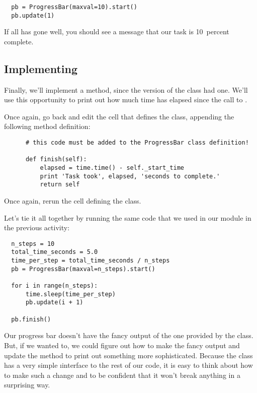 \documentclass[letterpaper, 12pt, titlepage, twoside]{article}
\begin{document}
\begin{lstlisting}
  pb = ProgressBar(maxval=10).start()
  pb.update(1)
\end{lstlisting}

If all has gone well, you should see a message that our task is 10~percent
complete.

\subsection*{Implementing }

Finally, we'll implement a  method, since the 
version of the class had one. We'll use this opportunity to print out how much
time has elapsed since the call to .

Once again, go back and edit the cell that defines the  class,
appending the following method definition:

\begin{lstlisting}
      # this code must be added to the ProgressBar class definition!

      def finish(self):
          elapsed = time.time() - self._start_time
          print 'Task took', elapsed, 'seconds to complete.'
          return self
\end{lstlisting}

Once again, rerun the cell defining the class.

Let's tie it all together by running the same code that we used in our module
in the previous activity:

\begin{lstlisting}
  n_steps = 10
  total_time_seconds = 5.0
  time_per_step = total_time_seconds / n_steps
  pb = ProgressBar(maxval=n_steps).start()

  for i in range(n_steps):
      time.sleep(time_per_step)
      pb.update(i + 1)

  pb.finish()
\end{lstlisting}

Our progress bar doesn't have the fancy output of the one provided by the
 class. But, if we wanted to, we could figure out how to make
the fancy output and update the  method to print out something
more sophisticated. Because the  class has a very simple
\i{interface} to the rest of our code, it is easy to think about how to make
such a change and to be confident that it won't break anything in a surprising
way.
\end{document}
